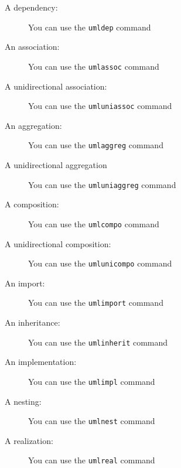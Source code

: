 \documentclass[a4paper,11pt]{report}
\begin{document}
\begin{description}
\item[A dependency:] You can use the {\tt umldep} command
\begin{center}
\end{center}
\item[An association:] You can use the {\tt umlassoc} command
\begin{center}
\end{center}
\item[A unidirectional association:] You can use the {\tt umluniassoc} command
\begin{center}
\end{center}
\item[An aggregation:] You can use the {\tt umlaggreg} command
\begin{center}
\end{center}
\item[A unidirectional aggregation ] You can use the {\tt umluniaggreg} command
\begin{center}
\end{center}
\item[A composition:] You can use the {\tt umlcompo} command
\begin{center}
\end{center}
\item[A unidirectional composition:] You can use the {\tt umlunicompo} command
\begin{center}
\end{center}
\item[An import:] You can use the {\tt umlimport} command
\begin{center}
\end{center}
\item[An inheritance:] You can use the {\tt umlinherit} command
\begin{center}
\end{center}
\item[An implementation:] You can use the {\tt umlimpl} command
\begin{center}
\end{center}
\item[A nesting:] You can use the {\tt umlnest} command
\begin{center}
\end{center}
\item[A realization:] You can use the {\tt umlreal} command
\begin{center}
\end{center}
\end{description}
\end{document}
